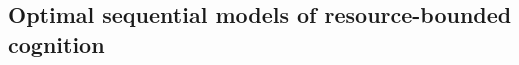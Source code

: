 


\subsection{Optimal sequential models of resource-bounded cognition}\label{sec:intro-final}



\newcommand{\hl}[2]{%
  {\color{#1!90!black} #2}
}

\newcommand{\specialitem}[2]{%
  \item[%
    {\color{#1} \textbf{#2}}%
  ]
}

